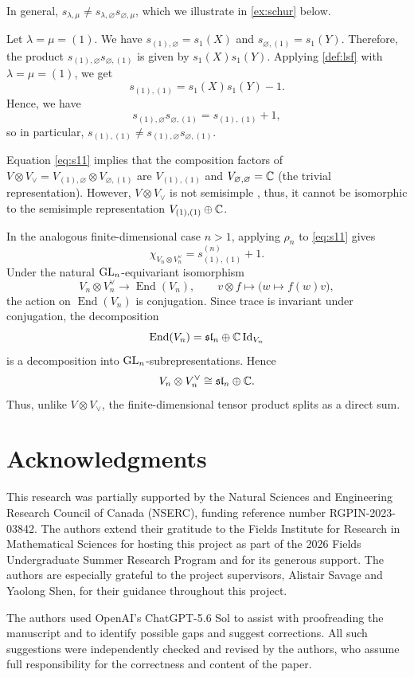 \documentclass[11pt]{amsart}
\begin{document}
 In general, \(s_{\lambda,\mu}\neq s_{\lambda,\varnothing}s_{\varnothing,\mu}\), which we illustrate in \cref{ex:schur} below. 
\begin{eg}\label{ex:schur}
   Let \(\lambda = \mu = (1)\). We have $ s_{(1),\varnothing}=s_1(X)$ and $s_{\varnothing,(1)}=s_1(Y)$.
   Therefore, the product $s_{(1),\varnothing}s_{\varnothing,(1)}$ is given by $s_1(X)s_1(Y)$. 
   Applying \cref{def:lsf} with $\lambda=\mu=(1)$, we get
    \[
    s_{(1),(1)}=s_1(X)s_1(Y)-1. 
    \]
    Hence, we have
    \begin{equation}\label{eq:s11}
        s_{(1),\varnothing}s_{\varnothing,(1)}
        =
        s_{(1),(1)}+1,
    \end{equation}
    so in particular, $s_{(1),(1)}
        \neq
        s_{(1),\varnothing}s_{\varnothing,(1)}$.
    \end{eg}
    
    Equation \cref{eq:s11} implies that the composition factors of \(V \otimes V_\vee = V_{(1),\varnothing} \otimes V_{\varnothing,(1)}\) are \(V_{(1),(1)}\) and \(V_{\varnothing,\varnothing} = \mathbb{C}\) (the trivial representation). However, \(V \otimes V_\vee\) is not semisimple \cite[\S 3.1.1]{SS15}, thus, it cannot be isomorphic to the semisimple representation \(V_{(1),(1)} \oplus \mathbb{C}\).

   In the analogous finite-dimensional case $n>1$, applying $\rho_n$ to
\cref{eq:s11} gives
\[
\chi_{V_n\otimes V_n^\vee}
=
s_{(1),(1)}^{(n)}+1.
\]
Under the natural $\mathrm{GL}_n$-equivariant isomorphism
\[
V_n\otimes V_n^\vee \longrightarrow \operatorname{End}(V_n),
\qquad
v\otimes f \longmapsto \bigl(w\mapsto f(w)v\bigr),
\]
the action on $\operatorname{End}(V_n)$ is conjugation. Since trace is
invariant under conjugation, the decomposition
\[
\operatorname{End}(V_n)
=
\mathfrak{sl}_n\oplus \mathbb{C}\operatorname{Id}_{V_n}
\]
is a decomposition into $\mathrm{GL}_n$-subrepresentations. Hence
\[
V_n\otimes V_n^\vee
\cong
\mathfrak{sl}_n\oplus\mathbb{C}.
\]
Thus, unlike $V\otimes V_\vee$, the finite-dimensional tensor product
splits as a direct sum.

    
\section*{Acknowledgments}
This research was partially supported by the Natural Sciences and Engineering Research Council of Canada (NSERC), funding reference number RGPIN-2023-03842. The authors extend their gratitude to the Fields Institute for Research in Mathematical Sciences for hosting this project as part of the 2026 Fields Undergraduate Summer Research Program and for its generous support. The authors are especially grateful to the project supervisors, Alistair Savage and Yaolong Shen, for their guidance throughout this project.


The authors used OpenAI’s ChatGPT-5.6 Sol to assist with proofreading the manuscript and to identify possible gaps and suggest corrections. All such suggestions were independently checked and revised by the authors, who assume full responsibility for the correctness and content of the paper.



\end{document}
